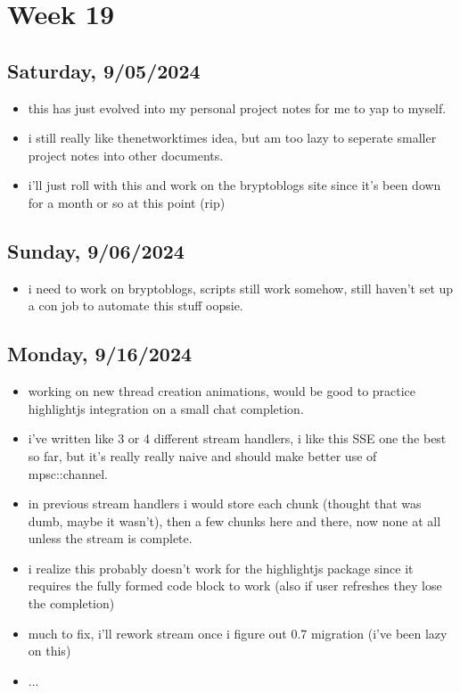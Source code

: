 \newpage
\section{Week 19}

\subsection*{Saturday, 9/05/2024}
\begin{itemize}
    \item this has just evolved into my personal project notes for me to yap to
        myself.
    \item i still really like thenetworktimes idea, but am too lazy to seperate
        smaller project notes into other documents.
    \item i'll just roll with this and work on the bryptoblogs site since it's
        been down for a month or so at this point (rip)
\end{itemize}

\subsection*{Sunday, 9/06/2024}
\begin{itemize}
    \item i need to work on bryptoblogs, scripts still work somehow, still
        haven't set up a con job to automate this stuff oopsie.
\end{itemize}

\subsection*{Monday, 9/16/2024}
\begin{itemize}
    \item working on new thread creation animations, would be good to practice
        highlightjs integration on a small chat completion. 
    \item i've written like 3 or 4 different stream handlers, i like this SSE
        one the best so far, but it's really really naive and should make better
        use of mpsc::channel.
    \item in previous stream handlers i would store each chunk (thought that was
        dumb, maybe it wasn't), then a few chunks here and there, now none at
        all unless the stream is complete.
    \item i realize this probably doesn't work for the highlightjs package since
        it requires the fully formed code block to work (also if user refreshes
        they lose the completion)
    \item much to fix, i'll rework stream once i figure out 0.7 migration (i've
        been lazy on this)
    \item ...
\end{itemize}
